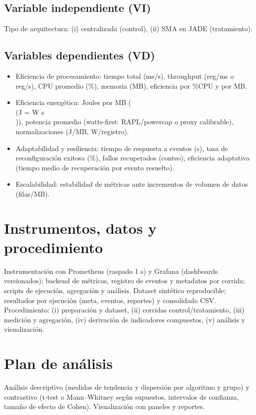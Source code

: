 \subsection*{Variable independiente (VI)}
Tipo de arquitectura: (i) centralizada (control), (ii) SMA en JADE (tratamiento).

\subsection*{Variables dependientes (VD)}
\begin{itemize}
  \item Eficiencia de procesamiento: tiempo total (ms/s), throughput (reg/ms o reg/s), CPU promedio (\%), memoria (MB), eficiencia por \%CPU y por MB.
  \item Eficiencia energética: Joules por MB (\\(J = W \times s\\)), potencia promedio (watts-first: RAPL/powercap o proxy calibrable), normalizaciones (J/MB, W/registro).
  \item Adaptabilidad y resiliencia: tiempo de respuesta a eventos (s), tasa de reconfiguración exitosa (\%), fallos recuperados (conteo), eficiencia adaptativa (tiempo medio de recuperación por evento resuelto).
  \item Escalabilidad: estabilidad de métricas ante incrementos de volumen de datos (filas/MB).
\end{itemize}

\section{Instrumentos, datos y procedimiento}
Instrumentación con Prometheus (raspado 1 s) y Grafana (dashboards versionados); backend de métricas, registro de eventos y metadatos por corrida; scripts de ejecución, agregación y análisis. Dataset sintético reproducible; resultados por ejecución (meta, eventos, reportes) y consolidado CSV. Procedimiento: (i) preparación y dataset, (ii) corridas control/tratamiento, (iii) medición y agregación, (iv) derivación de indicadores compuestos, (v) análisis y visualización.

\section{Plan de análisis}
Análisis descriptivo (medidas de tendencia y dispersión por algoritmo y grupo) y contrastivo (t-test o Mann--Whitney según supuestos, intervalos de confianza, tamaño de efecto de Cohen). Visualización con paneles y reportes.

